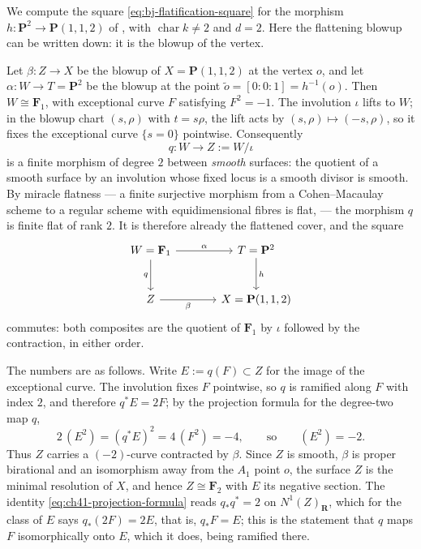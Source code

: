 \begin{example}
\label{ex:ch41-flatten-cone}
We compute the square \eqref{eq:bj-flatification-square} for the morphism
$h:\mathbf P^2\to\mathbf P(1,1,2)$ of , with
$\operatorname{char}k\ne2$ and $d=2$.  Here the flattening blowup can be
written down: it is the blowup of the vertex.

Let $\beta:Z\to X$ be the blowup of $X=\mathbf P(1,1,2)$ at the vertex
$o$, and let $\alpha:W\to T=\mathbf P^2$ be the blowup at the point
$\tilde o=[0:0:1]=h^{-1}(o)$.  Then $W\cong\mathbf F_1$, with
exceptional curve $F$ satisfying $F^2=-1$.  The involution $\iota$
lifts to $W$; in the blowup chart $(s,\rho)$ with $t=s\rho$, the lift
acts by $(s,\rho)\mapsto(-s,\rho)$, so it fixes the exceptional curve
$\{s=0\}$ pointwise.  Consequently
\[
 q:W\longrightarrow Z:=W/\iota
\]
is a finite morphism of degree $2$ between \emph{smooth} surfaces: the
quotient of a smooth surface by an involution whose fixed locus is a smooth
divisor is smooth.  By miracle flatness --- a finite surjective morphism
from a Cohen--Macaulay scheme to a regular scheme with equidimensional
fibres is flat, \cite[Theorem~23.1]{Mat89} --- the morphism $q$ is finite
flat of rank $2$.  It is therefore already the flattened cover, and the
square
\[
\begin{tikzcd}[column sep=large,row sep=large]
W=\mathbf F_1 \arrow[r,"\alpha"] \arrow[d,"q"'] &
T=\mathbf P^2 \arrow[d,"h"]\\
Z \arrow[r,"\beta"'] &
X=\mathbf P(1,1,2)
\end{tikzcd}
\]
commutes: both composites are the quotient of $\mathbf F_1$ by $\iota$
followed by the contraction, in either order.

The numbers are as follows.  Write $E:=q(F)\subset Z$ for the image of the
exceptional curve.  The involution fixes $F$ pointwise, so $q$ is
ramified along $F$ with index $2$, and therefore
$q^*E=2F$; by the projection formula for the degree-two map $q$,
\[
 2\,(E^2)=(q^*E)^2=4\,(F^2)=-4,
 \qquad\text{so}\qquad
 (E^2)=-2 .
\]
Thus $Z$ carries a $(-2)$-curve contracted by $\beta$.  Since $Z$ is
smooth, $\beta$ is proper birational and an isomorphism away from the
$A_1$ point $o$, the surface $Z$ is the minimal resolution of $X$,
and hence $Z\cong\mathbf F_2$ with $E$ its negative section.  The
identity
\eqref{eq:ch41-projection-formula} reads $q_*q^*=2$ on
$N^1(Z)_{\mathbf R}$, which for the class of $E$ says
$q_*(2F)=2E$, that is, $q_*F=E$; this is the statement that $q$ maps
$F$ isomorphically onto $E$, which it does, being ramified there.


\end{example}
